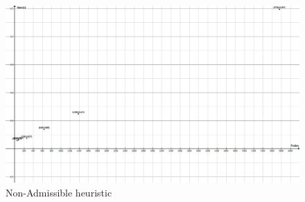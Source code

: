 \documentclass[a4paper,9pt]{article}
\begin{document}
\begin{figure}[H]
    \centering
    \includegraphics[width=\textheight,angle=90]{files/logNonAdm.png}
    \caption{Non-Admissible heuristic}
    \label{fig:lognonadm}
\end{figure}

\end{document}
